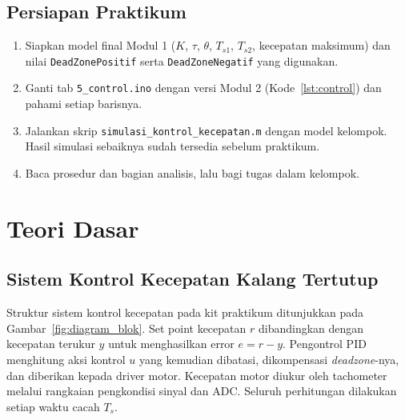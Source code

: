 \documentclass[11pt,a4paper]{article}
\newcommand{\prog}[1]{\texttt{#1}}
\begin{document}
\subsection{Persiapan Praktikum}
\begin{enumerate}
\item Siapkan model final Modul 1 ($K$, $\tau$, $\theta$, $T_{s1}$, $T_{s2}$, kecepatan maksimum) dan nilai \texttt{DeadZonePositif} serta \texttt{DeadZoneNegatif} yang digunakan.
\item Ganti tab \prog{5\_control.ino} dengan versi Modul 2 (Kode~\ref{lst:control}) dan pahami setiap barisnya.
\item Jalankan skrip \prog{simulasi\_kontrol\_kecepatan.m} dengan model kelompok. Hasil simulasi sebaiknya sudah tersedia sebelum praktikum.
\item Baca prosedur dan bagian analisis, lalu bagi tugas dalam kelompok.
\end{enumerate}

\section{Teori Dasar}
\subsection{Sistem Kontrol Kecepatan Kalang Tertutup}
Struktur sistem kontrol kecepatan pada kit praktikum ditunjukkan pada Gambar~\ref{fig:diagram_blok}. Set point kecepatan $r$ dibandingkan dengan kecepatan terukur $y$ untuk menghasilkan error $e = r - y$. Pengontrol PID menghitung aksi kontrol $u$ yang kemudian dibatasi, dikompensasi \textit{deadzone}-nya, dan diberikan kepada driver motor. Kecepatan motor diukur oleh tachometer melalui rangkaian pengkondisi sinyal dan ADC. Seluruh perhitungan dilakukan setiap waktu cacah $T_s$.
\end{document}
